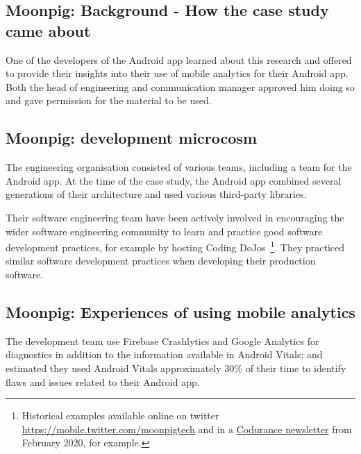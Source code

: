 \subsection{Moonpig: Background - How the case study came about}
One of the developers of the Android app learned about this research and offered to provide their insights into their use of mobile analytics for their Android app. Both the head of engineering and communication manager approved him doing so and gave permission for the material to be used.

\subsection{Moonpig: development microcosm}
The engineering organisation consisted of various teams, including a team for the Android app. At the time of the case study, the Android app combined several generations of their architecture and used various third-party libraries.

Their software engineering team have been actively involved in encouraging the wider software engineering community to learn and practice good software development practices, for example by hosting Coding DoJos~\footnote{Historical examples available online on twitter \url{https://mobile.twitter.com/moonpigtech} and in a \href{https://www.codurance.com/publications/newsletters/2020-02-13-newsletter}{Codurance newsletter} from February 2020, for example.}. They practiced similar software development practices when developing their production software.

\subsection{Moonpig: Experiences of using mobile analytics}
The development team use Firebase Crashlytics and Google Analytics for diagnostics in addition to the information available in Android Vitals; and estimated they used Android Vitals approximately 30\% of their time to identify flaws and issues related to their Android app.

